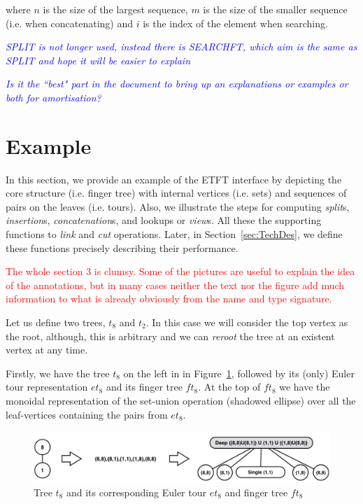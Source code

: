 \documentclass{elsarticle}
\newcommand{\tcr} [1]{\textcolor{red}{#1}}
\newcommand{\tcb} [1]{\emph{\textcolor{blue}{#1}}}
\begin{document}
where $n$ is the size of the largest sequence, $m$ is the size of the smaller sequence (i.e. when concatenating) and $i$ is the index of the element when searching. 

\tcb{SPLIT is not longer used, instead there is SEARCHFT, which aim is the same as SPLIT and hope it will be easier to explain}

\tcb{Is it the ``best" part in the document to bring up an explanations or examples or both for amortisation?}


\section{Example}
\label{sec:Example} 

In this section, we provide an example of the ETFT interface by depicting the core structure (i.e. finger tree) with internal vertices (i.e. sets) and sequences of pairs on the leaves (i.e. tours). Also, we illustrate the steps for computing \textit{split}s, \textit{insertion}s, \textit{concatenation}s, and lookups or \textit{view}s. All these the supporting functions to \textit{link} and \textit{cut} operations. Later, in Section~\ref{sec:TechDes}, we define these functions precisely describing their performance. 

\tcr{The whole section 3 is clumsy. Some of the pictures are useful to explain the idea of the annotations, but in many cases neither the text nor the figure add much information to what is already obviously from the name and type signature.}



Let us define two trees, $t_8$ and $t_2$. In this case we will consider the top vertex as the root, although, this is arbitrary and we can \textit{reroot} the tree at an existent vertex at any time.

Firstly, we have the tree $t_8$ on the left in in Figure~\ref{fig:t1et1ft1}, followed by its (only) Euler tour representation $et_8$ and its finger tree $ft_8$. At the top of $ft_8$ we have the monoidal representation of the set-union operation (shadowed ellipse) over all the leaf-vertices containing the pairs from $et_8$.
\begin{figure}
\begin{center}
\includegraphics[scale=0.35]{./Images/t1et1ft1} 
\end{center}
\caption{Tree $t_8$ and its corresponding Euler tour $et_8$ and finger tree $ft_8$}
\label{fig:t1et1ft1}
\end{figure}
\end{document}
